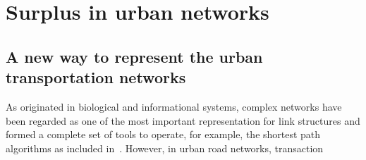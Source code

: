 \chapter{Surplus in urban networks}

\section{A new way to represent the urban transportation networks}

As originated in biological and informational systems, complex networks have been regarded as one of the most important representation for link structures and formed a complete set of tools to operate, for example, the shortest path algorithms as included in~\cite{Cormen2001Introduction}. However, in urban road networks, transaction